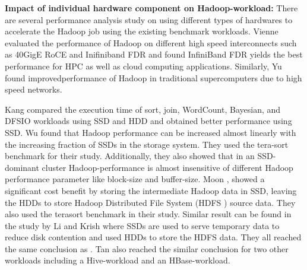 \documentclass[conference]{IEEEtran}
\begin{document}

\textbf{Impact of individual hardware component on Hadoop-workload:}
There are several performance analysis study on using different types of hardwares to accelerate the Hadoop job using the existing benchmark workloads.
Vienne \cite{ethib:vienne} evaluated the performance of Hadoop on different high speed interconnects such as 40GigE RoCE and Inifiniband FDR and found InfiniBand FDR yields the best performance for HPC as well as cloud computing applications.
Similarly, Yu \cite{ethib:yu} found improvedperformance of Hadoop in traditional supercomputers due to high speed networks.

Kang \cite{ssdhdd:kang} compared the execution time of sort, join, WordCount, Bayesian, and DFSIO workloads using SSD and HDD and obtained better performance using SSD.
Wu \cite{ssdhdd:wu} found that Hadoop performance can be increased almost linearly with the increasing fraction of SSDs in the storage system. They used the tera-sort benchmark for their study. Additionally, they also showed that in an SSD-dominant cluster Hadoop-performance is almost insensitive of different Hadoop performance parameter like block-size and buffer-size.
Moon \cite{ssdhdd:moon}, showed a significant cost benefit by storing the intermediate Hadoop data in SSD, leaving the HDDs to store Hadoop Distributed File System (HDFS \cite{fw:hdfs}) source data. They also used the terasort benchmark in their study.
Similar result can be found in the study by Li \cite{ssdhdd:li} and Krish \cite{ssdhdd:krish} where SSDs are used to serve temporary data to reduce disk contention and used HDDs to store the HDFS data. They all reached the same conclusion as \cite{ssdhdd:moon}.  
Tan \cite{ssdhdd:tan} also reached the similar conclusion for two other workloads including a Hive-workload and an HBase-workload.
\end{document}
